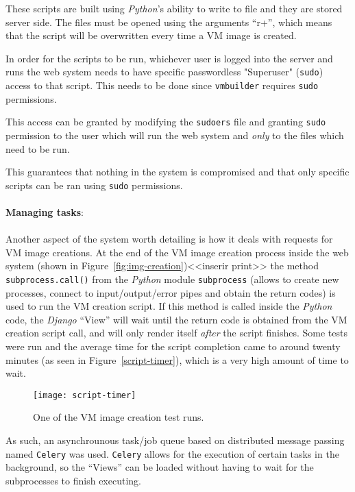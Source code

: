 These scripts are built using \textit{Python}'s ability to write to file and they are stored server side. The files must be opened using the arguments ``r+'', which means that the script will be overwritten every time a VM image is created.

In order for the scripts to be run, whichever user is logged into the server and runs the web system needs to have specific passwordless "Superuser" (\texttt{sudo}) access to that script. This needs to be done since \texttt{vmbuilder} requires \texttt{sudo} permissions. 

This access can be granted by modifying the \texttt{sudoers} file and granting \texttt{sudo} permission to the user which will run the web system and \emph{only} to the files which need to be run.

This guarantees that nothing in the system is compromised and that only specific scripts can be ran using \texttt{sudo} permissions.\\
\ \\
\textbf{Managing tasks}:\\
\ \\
Another aspect of the system worth detailing is how it deals with requests for VM image creations. At the end of the VM image creation process inside the web system (shown in Figure~\ref{fig:img-creation})<<inserir print>> the method \texttt{subprocess.call()} from the \textit{Python} module \texttt{subprocess} (allows to create new processes, connect to input/output/error pipes and obtain the return codes) is used to run the VM creation script. If this method is called inside the \textit{Python} code, the \textit{Django} ``View'' will wait until the return code is obtained from the VM creation script call, and will only render itself \emph{after} the script finishes. Some tests were run and the average time for the script completion came to around twenty minutes (as seen in Figure~\ref{script-timer}), which is a very high amount of time to wait.

\begin{figure}[h]
  \begin{center}
    \leavevmode
    \texttt{[image: script-timer]}
    \caption{One of the VM image creation test runs.}
    \label{fig:script-timer}
  \end{center}
\end{figure}

As such, an asynchrounous task/job queue based on distributed message passing named \texttt{Celery} was used. \texttt{Celery} allows for the execution of certain tasks in the background, so the ``Views'' can be loaded without having to wait for the subprocesses to finish executing.

